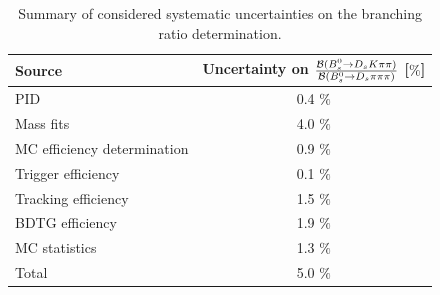 \begin{table}[h!]
\centering
\begin{tabular}{l c}
Source  & Uncertainty on $\frac{\mathcal{B}({{B}^0_{s}}\rightarrow{\ensuremath{{D}_{s}}}{\ensuremath{K}}{\ensuremath{\pi}}{\ensuremath{\pi}})}{\mathcal{B}({{B}^0_{s}}\rightarrow{\ensuremath{{D}_{s}}}{\ensuremath{\pi}}{\ensuremath{\pi}}{\ensuremath{\pi}})}$ [$\%$]\\
\hline
PID & 0.4 $\%$ \\
Mass fits & 4.0 $\%$\\
MC efficiency determination & 0.9 $\%$\\
Trigger efficiency & 0.1 $\%$\\
Tracking efficiency & 1.5 $\%$\\
BDTG efficiency & 1.9 $\%$ \\
MC statistics & 1.3 $\%$ \\
\hline
Total & 5.0 $\%$\\
\hline
\end{tabular}
\caption{Summary of considered systematic uncertainties on the branching ratio determination.}
\label{tab: systTab}
\end{table}
